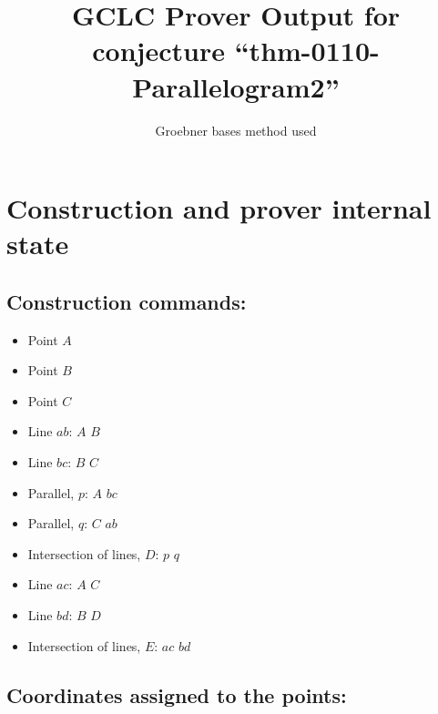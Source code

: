 \documentclass[a4paper]{article}
\begin{document}
\title{GCLC Prover Output for conjecture ``thm-0110-Parallelogram2'' }

\author{Groebner bases method used}

\maketitle





\section{Construction and prover internal state}





\subsection*{Construction commands:}

\begin{itemize}

\item 

Point $A$ 
\item 

Point $B$ 
\item 

Point $C$ 
\item 

Line $ab$: $A$ $B$ 
\item 

Line $bc$: $B$ $C$ 
\item 

Parallel, $p$: $A$ $bc$ 
\item 

Parallel, $q$: $C$ $ab$ 
\item 

Intersection of lines, $D$: $p$ $q$ 
\item 

Line $ac$: $A$ $C$ 
\item 

Line $bd$: $B$ $D$ 
\item 

Intersection of lines, $E$: $ac$ $bd$ 
\end{itemize}





\subsection*{Coordinates assigned to the points:}
\end{document}
